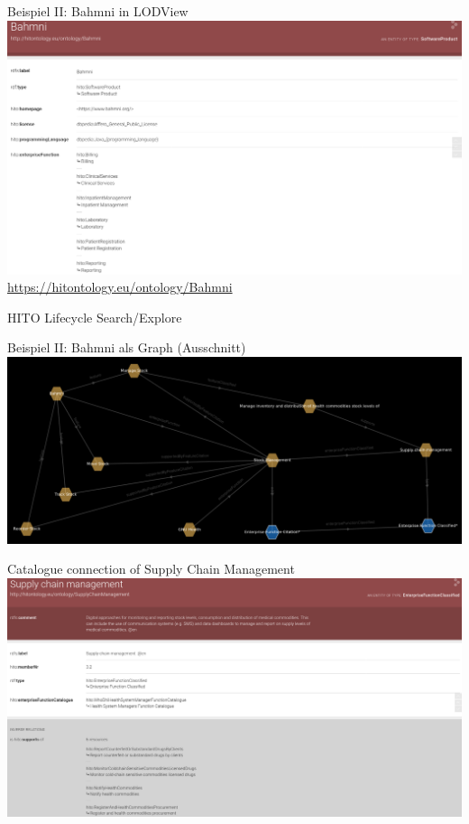 \documentclass[aspectratio=1610,12pt]{beamer}
\begin{document}
\begin{frame}{Beispiel II: Bahmni in LODView}
\vspace{-0.3cm}
\centering
\includegraphics[width=.95\textwidth]{img/bahmni.png}
\footnotesize{\url{https://hitontology.eu/ontology/Bahmni}}
\end{frame}

\begin{frame}{HITO Lifecycle Search/Explore}
  \centering
  \vspace{-0.5cm}
\end{frame}

\begin{frame}{Beispiel II: Bahmni als Graph (Ausschnitt)}
  \includegraphics[width=\textwidth, height=.65\textheight]{img/bahmni_star.png}
\end{frame}

\begin{frame}{Catalogue connection of Supply Chain Management}
  \includegraphics[width=\textwidth]{img/supplychainmanagement.png}
\end{frame}
\end{document}
